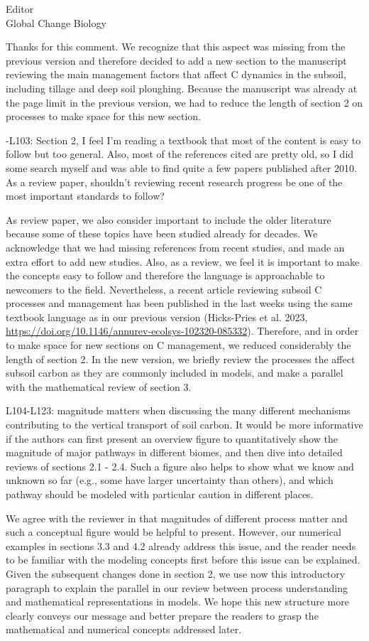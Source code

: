 \documentclass[11pt]{bgcletter}
\newcommand{\answer}[1] {
{\color{cyan} #1}
}
\begin{document}
\begin{letter}{Editor\\
   Global Change Biology
}
\answer{Thanks for this comment. We recognize that this aspect was missing from the previous version and therefore decided to add a new section to the manuscript reviewing the main management factors that affect C dynamics in the subsoil, including tillage and deep soil ploughing. Because the manuscript was already at the page limit in the previous version, we had to reduce the length of section 2 on processes to make space for this new section.}

-L103: Section 2, I feel I'm reading a textbook that most of the content is easy to follow but too general. Also, most of the references cited are pretty old, so I did some search myself and was able to find quite a few papers published after 2010. As a review paper, shouldn't reviewing recent research progress be one of the most important standards to follow?

\answer{As review paper, we also consider important to include the older literature because some of these topics have been studied already for decades. We acknowledge that we had missing references from recent studies, and made an extra effort to add new studies. Also, as a review, we feel it is important to make the concepts easy to follow and therefore the language is approachable to newcomers to the field. Nevertheless, a recent article reviewing subsoil C processes and management has been published in the last weeks using the same textbook language as in our previous version (Hicks-Pries et al. 2023, \url{https://doi.org/10.1146/annurev-ecolsys-102320-085332}). Therefore, and in order to make space for new sections on C management, we reduced considerably the length of section 2. In the new version, we briefly review the processes the affect subsoil carbon as they are commonly included in models, and make a parallel with the mathematical review of section 3.}

L104-L123: magnitude matters when discussing the many different mechanisms contributing to the vertical transport of soil carbon. It would be more informative if the authors can first present an overview figure to quantitatively show the magnitude of major pathways in different biomes, and then dive into detailed reviews of sections 2.1 - 2.4. Such a figure also helps to show what we know and unknown so far (e.g., some have larger uncertainty than others), and which pathway should be modeled with particular caution in different places.

\answer{We agree with the reviewer in that magnitudes of different process matter and such a conceptual figure would be helpful to present. However, our numerical examples in sections 3.3 and 4.2 already address this issue, and the reader needs to be familiar with the modeling concepts first before this issue can be explained. Given the subsequent changes done in section 2, we use now this introductory paragraph to explain the parallel in our review between process understanding and mathematical representations in models. We hope this new structure more clearly conveys our message and better prepare the readers to grasp the mathematical and numerical concepts addressed later.}


\end{letter}
\end{document}
